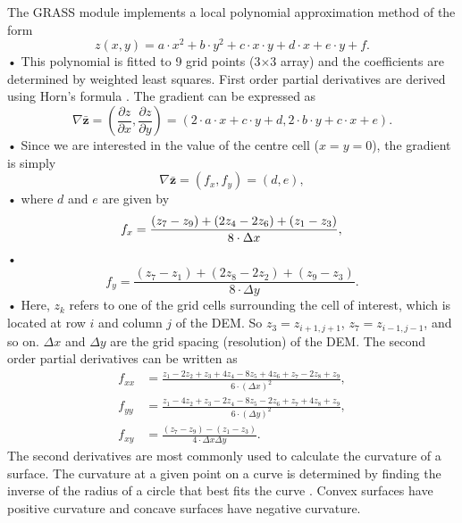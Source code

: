 \documentclass[12pt]{article}
\begin{document}
The GRASS module implements a local polynomial approximation method of the form 
\begin{equation}
z(x,y) = a\cdot x^2 +b\cdot y^2 +c \cdot x\cdot y +d \cdot x + e\cdot y +f.
\end{equation}•
This polynomial is fitted to 9 grid points (3$\times$3 array) and the coefficients are determined by weighted least squares. 
First order partial derivatives are derived using Horn's formula \citep{Horn1981, Neteler2013} . The gradient can be expressed as
\begin{equation}
\nabla \bar{ \bm{z}} = \left( \frac{\partial z}{\partial x}, \frac{\partial z}{\partial y} \right) = \left( 2 \cdot a  \cdot x + c  \cdot y +d, 2 \cdot b  \cdot y + c  \cdot x + e \right) .
\end{equation}•
Since we are interested in the value of the centre cell ($x=y=0$), the gradient is simply 
\begin{equation}
\nabla \bar{ \bm{z}} = (f_x,f_y) = (d,e),
\end{equation}•
where $d$ and $e$ are given by
\begin{equation}
f_x = \frac{(z_7-z_9)+(2z_4-2z_6)+(z_1-z_3)}{8 \cdot \Delta x},\\
\end{equation}•
\begin{equation}
f_y = \frac{(z_7-z_1)+(2z_8-2z_2)+(z_9-z_3)}{8 \cdot \Delta y}.
\end{equation}•
Here, $z_k$ refers to one of the grid cells surrounding the cell of interest, which is located at row $i$ and column $j$ of the DEM. So $z_3 = z_{i+1,j+1}$, $z_7 = z_{i-1,j-1}$, and so on. $\Delta x$ and $\Delta y$ are the grid spacing (resolution) of the DEM. The second order partial derivatives can be written as \citep{Hofierka2009, Neteler2013}
\begin{align}
f_{xx} &= \frac{z_1-2z_2+z_3+4z_4-8z_5+4z_6+z_7-2z_8+z_9}{6 \cdot (\Delta x)^2},\\
f_{yy} &= \frac{z_1-4z_2+z_3-2z_4-8z_5-2z_6+z_7+4z_8+z_9}{6 \cdot (\Delta y)^2},\\
f_{xy} &= \frac{(z_7-z_9)-(z_1-z_3)}{4 \cdot \Delta x \Delta y}.
\end{align}
The second derivatives are most commonly used to calculate the curvature of a surface. The curvature at a given point on a curve is determined by finding the inverse of the radius of a circle that best fits the curve \citep{Olaya2009}. Convex surfaces have positive curvature and concave surfaces have negative curvature. 
\end{document}

